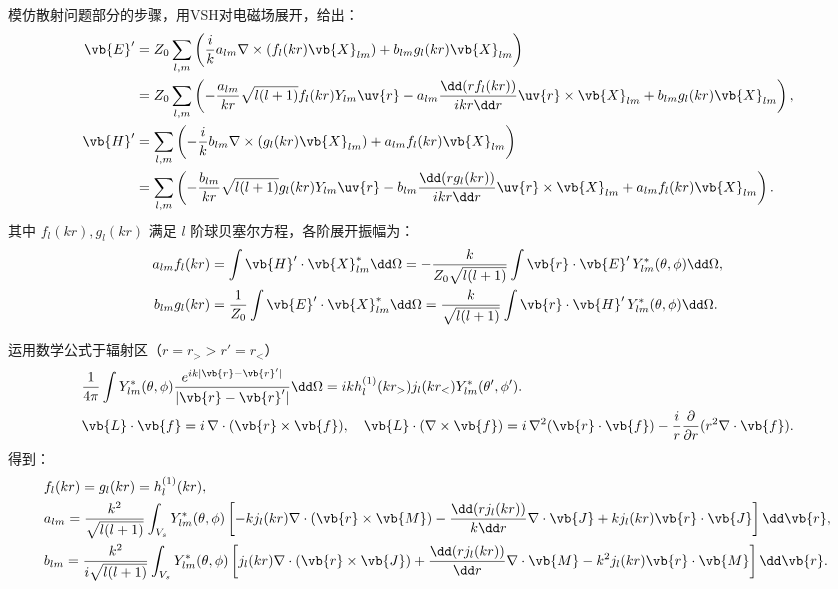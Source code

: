 模仿散射问题部分的步骤，用VSH对电磁场展开，给出：
\begin{align*}
	\vb{E}' & = Z_0 \sum_{l,m} \left( \frac{i}{k} a_{lm} \nabla \times \left( f_l(kr) \vb{X}_{lm} \right) + b_{lm} g_l(kr) \vb{X}_{lm} \right)                                                       \\
	        & = Z_0 \sum_{l,m} \left( -\frac{a_{lm}}{k r} \sqrt{l(l+1)} f_l(kr) Y_{lm} \uv{r} - a_{lm} \frac{\dd(r f_l(kr))}{ikr\dd r} \uv{r} \times \vb{X}_{lm} + b_{lm} g_l(kr) \vb{X}_{lm} \right), \\
	\vb{H}' & = \sum_{l,m} \left( -\frac{i}{k} b_{lm} \nabla \times \left( g_l(kr) \vb{X}_{lm} \right) + a_{lm} f_l(kr) \vb{X}_{lm} \right)                                                          \\
	        & = \sum_{l,m} \left( -\frac{b_{lm}}{k r} \sqrt{l(l+1)} g_l(kr) Y_{lm} \uv{r} -  b_{lm} \frac{\dd(r g_l(kr))}{ikr\dd r} \uv{r} \times \vb{X}_{lm} + a_{lm} f_l(kr) \vb{X}_{lm} \right).
\end{align*}
其中 \(f_l(kr), g_l(kr)\) 满足 \(l\) 阶球贝塞尔方程，各阶展开振幅为：
\begin{align*}
	a_{lm} f_l(kr) &= \int \vb{H}' \cdot \vb{X}_{lm}^\ast \dd \Omega = -\frac{k}{Z_0 \sqrt{l(l+1)}} \int \vb{r} \cdot \vb{E}'\, Y_{lm}^\ast (\theta, \phi) \dd \Omega,\\
	b_{lm} g_l(kr) &=\frac{1}{Z_0} \int \vb{E}' \cdot \vb{X}_{lm}^\ast \dd \Omega = \frac{k}{\sqrt{l(l+1)}} \int \vb{r} \cdot \vb{H}'\, Y_{lm}^\ast (\theta, \phi) \dd \Omega.
\end{align*}

运用数学公式于辐射区（\(r = r_> > r' = r_<\)）
\begin{align*}
	&\frac{1}{4 \pi} \int Y_{lm}^\ast (\theta, \phi) \frac{e^{i k |\vb{r} - \vb{r}'|}}{|\vb{r} - \vb{r}'|} \dd \Omega = i k h_l^{(1)}(k r_>) j_l(k r_<) Y_{lm}^\ast (\theta', \phi').\\
	&\vb{L} \cdot \vb{f} = i \,\nabla \cdot (\vb{r} \times \vb{f}),\quad
	\vb{L} \cdot (\nabla \times \vb{f}) = i \,\nabla^2 (\vb{r} \cdot \vb{f}) - \frac{i}{r} \frac{\partial}{\partial r} (r^2 \nabla \cdot \vb{f}).
\end{align*}
得到：
\begin{align*}
	&f_l(kr) = g_l(kr) = h_l^{(1)}(kr),\\
	&a_{lm} = \frac{k^2}{\sqrt{l(l+1)}} \int_{V_s} Y_{lm}^\ast (\theta, \phi) \left[ -k j_l(kr) \nabla \cdot (\vb{r} \times \vb{M}) - \frac{\dd(r j_l(kr))}{k \dd r} \nabla \cdot \vb{J} + k j_l(kr) \vb{r} \cdot \vb{J} \right] \dd \vb{r},\\
	&b_{lm} = \frac{k^2}{i \sqrt{l(l+1)}} \int_{V_s} Y_{lm}^\ast (\theta, \phi) \left[ j_l(kr) \nabla \cdot (\vb{r} \times \vb{J}) + \frac{\dd(r j_l(kr))}{\dd r} \nabla \cdot \vb{M} - k^2 j_l(kr) \vb{r} \cdot \vb{M} \right] \dd \vb{r}.
\end{align*}

